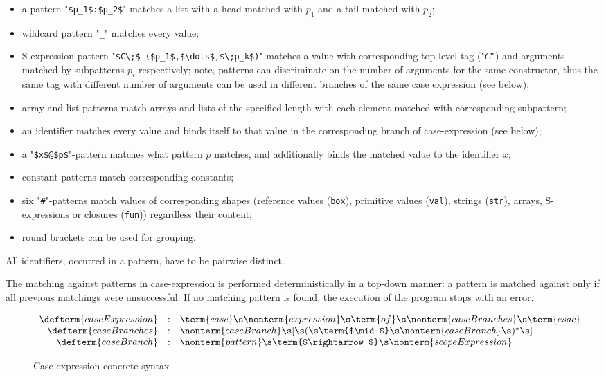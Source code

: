 \begin{itemize}
\item a pattern "\lstinline|$p_1$:$p_2$|" matches a list with a head matched with $p_1$ and a tail matched with $p_2$;
\item wildcard pattern "\lstinline|_|" matches every value;
\item S-expression pattern "\lstinline|$C\;$ ($p_1$,$\dots$,$\;p_k$)|" matches a value with corresponding top-level
  tag ("$C$") and arguments matched by subpatterns $p_i$ respectively; note, patterns can discriminate on the
  number of arguments for the same constructor, thus the same tag with different number of arguments can be
  used in different branches of the same case expression (see below);
\item array and list patterns match arrays and lists of the specified length with each element matched with
  corresponding subpattern;
\item an identifier matches every value and binds itself to that value in the corresponding branch of
  case-expression (see below);
\item a "\lstinline|$x$@$p$|"-pattern matches what pattern $p$ matches, and additionally binds the
  matched value to the identifier $x$;
\item constant patterns match corresponding constants;
\item six "\lstinline|#|"-patterns match values of corresponding shapes (reference values (\lstinline|box|), primitive values (\lstinline|val|),
  strings (\lstinline|str|), arrays, S-expressions or closures (\lstinline|fun|)) regardless their content;
  \item round brackets can be used for grouping.
\end{itemize}

All identifiers, occurred in a pattern, have to be pairwise distinct.

The matching against patterns in case-expression is performed deterministically in a top-down manner: a pattern
is matched against only if all previous matchings were unsuccessful. If no matching pattern is found, the execution
of the program stops with an error.

\begin{figure}[t]
  \[
    \begin{array}{rcl}
      \defterm{caseExpression}  & : & \term{case}\s\nonterm{expression}\s\term{of}\s\nonterm{caseBranches}\s\term{esac}\\
      \defterm{caseBranches}    & : & \nonterm{caseBranch}\s[\s(\s\term{$\mid$}\s\nonterm{caseBranch}\s)^\star\s]\\
      \defterm{caseBranch}      & : & \nonterm{pattern}\s\term{$\rightarrow$}\s\nonterm{scopeExpression}
    \end{array}
  \]
  \caption{Case-expression concrete syntax}
  \label{case_expression}
\end{figure}

